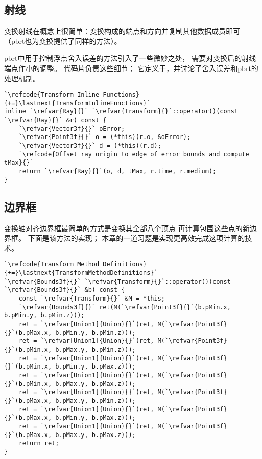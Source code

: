 \subsection{射线}\label{sub:射线}
变换射线在概念上很简单：变换构成的端点和方向并复制其他数据成员即可
（pbrt也为变换提供了同样的方法）。

pbrt中用于控制浮点舍入误差的方法引入了一些微妙之处，
需要对变换后的射线端点作小的调整。
代码片负责这些细节；
它定义于，并讨论了舍入误差和pbrt的处理机制。
\begin{lstlisting}
`\refcode{Transform Inline Functions}{+=}\lastnext{TransformInlineFunctions}`
inline `\refvar{Ray}{}` `\refvar{Transform}{}`::operator()(const `\refvar{Ray}{}` &r) const { 
    `\refvar{Vector3f}{}` oError;
    `\refvar{Point3f}{}` o = (*this)(r.o, &oError);
    `\refvar{Vector3f}{}` d = (*this)(r.d);
    `\refcode{Offset ray origin to edge of error bounds and compute tMax}{}`
    return `\refvar{Ray}{}`(o, d, tMax, r.time, r.medium);
}
\end{lstlisting}

\subsection{边界框}\label{sub:边界框}
变换轴对齐边界框最简单的方式是变换其全部八个顶点
再计算包围这些点的新边界框。
下面是该方法的实现；
本章的一道习题是实现更高效完成这项计算的技术。
\begin{lstlisting}
`\refcode{Transform Method Definitions}{+=}\lastnext{TransformMethodDefinitions}`
`\refvar{Bounds3f}{}` `\refvar{Transform}{}`::operator()(const `\refvar{Bounds3f}{}` &b) const {
    const `\refvar{Transform}{}` &M = *this;
    `\refvar{Bounds3f}{}` ret(M(`\refvar{Point3f}{}`(b.pMin.x, b.pMin.y, b.pMin.z)));    
    ret = `\refvar[Union1]{Union}{}`(ret, M(`\refvar{Point3f}{}`(b.pMax.x, b.pMin.y, b.pMin.z)));
    ret = `\refvar[Union1]{Union}{}`(ret, M(`\refvar{Point3f}{}`(b.pMin.x, b.pMax.y, b.pMin.z)));
    ret = `\refvar[Union1]{Union}{}`(ret, M(`\refvar{Point3f}{}`(b.pMin.x, b.pMin.y, b.pMax.z)));
    ret = `\refvar[Union1]{Union}{}`(ret, M(`\refvar{Point3f}{}`(b.pMin.x, b.pMax.y, b.pMax.z)));
    ret = `\refvar[Union1]{Union}{}`(ret, M(`\refvar{Point3f}{}`(b.pMax.x, b.pMax.y, b.pMin.z)));
    ret = `\refvar[Union1]{Union}{}`(ret, M(`\refvar{Point3f}{}`(b.pMax.x, b.pMin.y, b.pMax.z)));
    ret = `\refvar[Union1]{Union}{}`(ret, M(`\refvar{Point3f}{}`(b.pMax.x, b.pMax.y, b.pMax.z)));
    return ret;
}
\end{lstlisting}

